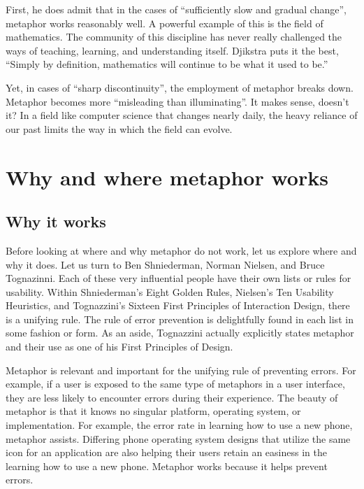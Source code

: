 \documentclass[11pt, oneside]{article}   	%
\begin{document}
First, he does admit that in the cases of ``sufficiently slow and gradual change'', metaphor works reasonably well. A powerful example of this is the field of mathematics. The community of this discipline has never really challenged the ways of teaching, learning, and understanding itself. Djikstra puts it the best, ``Simply by definition, mathematics will continue to be what it used to be.''

Yet, in cases of ``sharp discontinuity'', the employment of metaphor breaks down. Metaphor becomes more ``misleading than illuminating''. It makes sense, doesn't it? In a field like computer science that changes nearly daily, the heavy reliance of our past limits the way in which the field can evolve.
\cite{ewd1036}

\section{Why and where metaphor works}
\subsection{Why it works}
Before looking at where and why metaphor do not work, let us explore where and why it does. Let us turn to Ben Shniederman, Norman Nielsen, and Bruce Tognazinni. Each of these very influential people have their own lists or rules for usability. Within Shniederman's Eight Golden Rules, Nielsen's Ten Usability Heuristics, and Tognazzini's Sixteen First Principles of Interaction Design, there is a unifying rule. The rule of error prevention is delightfully found in each list in some fashion or form. \cite{shniederman-golden-rules} \cite{tognazzini-first-principles} \cite{nielsen-usability-heuristics} As an aside, Tognazzini actually explicitly states metaphor and their use as one of his First Principles of Design.

Metaphor is relevant and important for the unifying rule of preventing errors. For example, if a user is exposed to the same type of metaphors in a user interface, they are less likely to encounter errors during their experience. The beauty of metaphor is that it knows no singular platform, operating system, or implementation. For example, the error rate in learning how to use a new phone, metaphor assists. Differing phone operating system designs that utilize the same icon for an application are also helping their users retain an easiness in the learning how to use a new phone. Metaphor works because it helps prevent errors.
\end{document}
